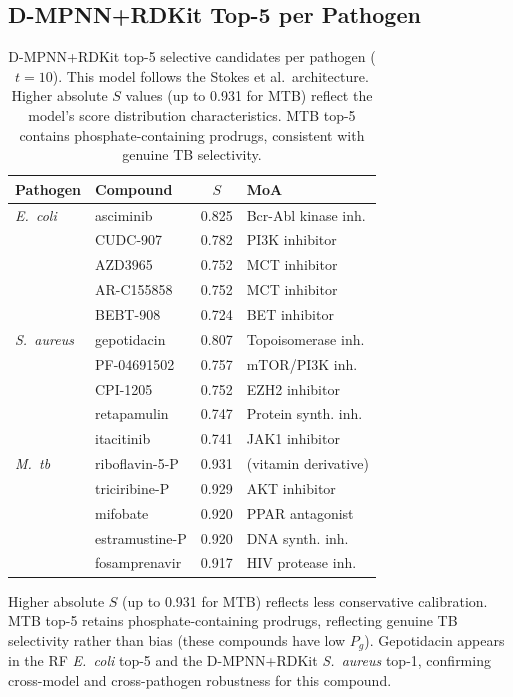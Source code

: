 \documentclass{article}
\begin{document}
\subsection{D-MPNN+RDKit Top-5 per Pathogen}

\begin{table}[ht]
\caption{D-MPNN+RDKit top-5 selective candidates per pathogen ($t{=}10$). This model follows the Stokes et al.\ architecture. Higher absolute $S$ values (up to 0.931 for MTB) reflect the model's score distribution characteristics. MTB top-5 contains phosphate-containing prodrugs, consistent with genuine TB selectivity.}
\label{tab:rdkit_top5}
\centering
\scriptsize
\begin{tabular}{llcl}
\toprule
\textbf{Pathogen} & \textbf{Compound} & $S$ & \textbf{MoA} \\
\midrule
\textit{E.~coli} & asciminib & 0.825 & Bcr-Abl kinase inh. \\
& CUDC-907 & 0.782 & PI3K inhibitor \\
& AZD3965 & 0.752 & MCT inhibitor \\
& AR-C155858 & 0.752 & MCT inhibitor \\
& BEBT-908 & 0.724 & BET inhibitor \\
\midrule
\textit{S.~aureus} & gepotidacin & 0.807 & Topoisomerase inh. \\
& PF-04691502 & 0.757 & mTOR/PI3K inh. \\
& CPI-1205 & 0.752 & EZH2 inhibitor \\
& retapamulin & 0.747 & Protein synth. inh. \\
& itacitinib & 0.741 & JAK1 inhibitor \\
\midrule
\textit{M.~tb} & riboflavin-5-P & 0.931 & (vitamin derivative) \\
& triciribine-P & 0.929 & AKT inhibitor \\
& mifobate & 0.920 & PPAR antagonist \\
& estramustine-P & 0.920 & DNA synth. inh. \\
& fosamprenavir & 0.917 & HIV protease inh. \\
\bottomrule
\end{tabular}
\end{table}

Higher absolute $S$ (up to 0.931 for MTB) reflects less conservative calibration.
MTB top-5 retains phosphate-containing prodrugs, reflecting genuine TB selectivity rather than bias (these compounds have low $P_g$).
Gepotidacin appears in the RF \textit{E.~coli} top-5 and the D-MPNN+RDKit \textit{S.~aureus} top-1, confirming cross-model and cross-pathogen robustness for this compound.
\end{document}

